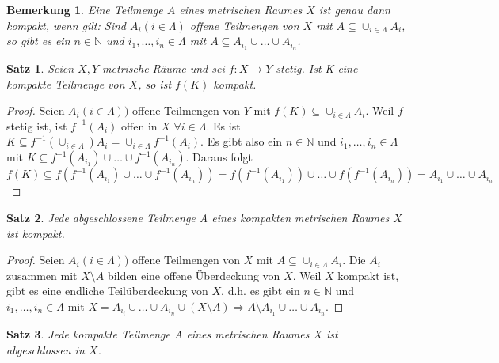 \documentclass[10pt,a4paper]{report}
\newtheorem{satz}{Satz}
\newtheorem*{remark}{Bemerkung}
\begin{document}
\begin{remark}
  Eine Teilmenge $A$ eines metrischen Raumes $X$ ist genau dann kompakt, wenn gilt:
  Sind $A_{i} (i \in \Lambda)$ offene Teilmengen von $X$ mit $A \subseteq \cup_{i \in \Lambda} A_{i}$, so gibt es ein $n \in \mathbb{N}$ und $i_{1}, \dots, i_{n} \in \Lambda$ mit $A \subseteq A_{i_{1}} \cup \dots \cup A_{i_{n}}$.
\end{remark}

\begin{satz}
  Seien $X, Y$ metrische Räume und sei $f : X \rightarrow Y$ stetig.
  Ist K eine kompakte Teilmenge von $X$, so ist $f(K)$ kompakt.
\end{satz}

\begin{proof}
  Seien $A_{i} (i \in \Lambda))$ offene Teilmengen von $Y$ mit $f(K) \subseteq \cup_{i \in \Lambda} A_{i}$.
  Weil $f$ stetig ist, ist $f^{-1}(A_{i})$ offen in $X$ $\forall i \in \Lambda$.
  Es ist $K \subseteq f^{-1}(\cup_{i \in \Lambda}) A_{i} = \cup_{i \in \Lambda} f^{-1}(A_{i})$.
  Es gibt also ein $n \in \mathbb{N}$ und $i_{1}, \dots, i_{n} \in \Lambda$ mit $K \subseteq f^{-1}(A_{i_{1}}) \cup \dots \cup f^{-1}(A_{i_{n}})$.
  Daraus folgt
  \begin{equation}
    f(K) \subseteq f(f^{-1}(A_{i_{1}}) \cup \dots \cup f^{-1}(A_{i_{n}})) = f(f^{-1}(A_{i_{1}})) \cup \dots \cup f(f^{-1}(A_{i_{n}})) = A_{i_{1}} \cup \dots \cup A_{i_{n}}
  \end{equation}
\end{proof}

\begin{satz}
  Jede abgeschlossene Teilmenge A eines kompakten metrischen Raumes $X$ ist kompakt.
\end{satz}

\begin{proof}
  Seien $A_{i} (i \in \Lambda))$ offene Teilmengen von $X$ mit $A \subseteq \cup_{i \in \Lambda} A_{i}$.
  Die $A_{i}$ zusammen mit $X \setminus A$ bilden eine offene Überdeckung von $X$.
  Weil $X$ kompakt ist, gibt es eine endliche Teilüberdeckung von $X$, d.h. es gibt ein $n \in \mathbb{N}$ und $i_{1}, \dots, i_{n} \in \Lambda$ mit $X = A_{i_{i}} \cup \dots \cup A_{i_{n}} \cup (X \setminus A) \Rightarrow A \setminus A_{i_{1}} \cup \dots \cup A_{i_{n}}$.
\end{proof}

\begin{satz}
  Jede kompakte Teilmenge $A$ eines metrischen Raumes $X$ ist abgeschlossen in $X$.
\end{satz}
\end{document}
